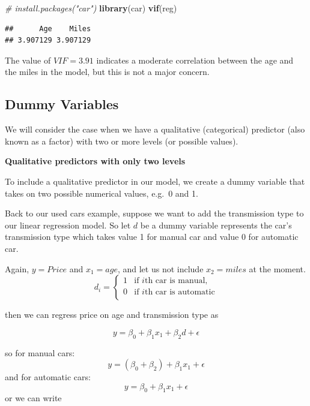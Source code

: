 \documentclass[
]{article}
\newenvironment{Shaded}{\begin{snugshade}}{\end{snugshade}}
\newcommand{\CommentTok}[1]{\textcolor[rgb]{0.56,0.35,0.01}{\textit{#1}}}
\newcommand{\FunctionTok}[1]{\textcolor[rgb]{0.13,0.29,0.53}{\textbf{#1}}}
\newcommand{\NormalTok}[1]{#1}
\begin{document}

\begin{Shaded}
\begin{Highlighting}[]
\CommentTok{\# install.packages("car")}
\FunctionTok{library}\NormalTok{(car)}
\FunctionTok{vif}\NormalTok{(reg)}
\end{Highlighting}
\end{Shaded}

\begin{verbatim}
##      Age    Miles 
## 3.907129 3.907129
\end{verbatim}

The value of \(VIF=3.91\) indicates a moderate correlation between the
age and the miles in the model, but this is not a major concern.

\hypertarget{dummy-variables}{%
\subsection{Dummy Variables}\label{dummy-variables}}

We will consider the case when we have a qualitative (categorical)
predictor (also known as a factor) with two or more levels (or possible
values).

\textbf{Qualitative predictors with only two levels}

To include a qualitative predictor in our model, we create a dummy
variable that takes on two possible numerical values, e.g.~0 and 1.

Back to our used cars example, suppose we want to add the transmission
type to our linear regression model. So let \(d\) be a dummy variable
represents the car's transmission type which takes value 1 for manual
car and value 0 for automatic car.

Again, \(y=Price\) and \(x_1=age\), and let us not include \(x_2=miles\)
at the moment. \[d_i=\left\{\begin{array}{ll}
1& \text{if $i$th car is manual,}\\
0& \text{if $i$th car is automatic}\\
\end{array}\right.\]

then we can regress price on age and transmission type as

\[y=\beta_0+\beta_1 x_1+\beta_2 d+\epsilon\]

so for manual cars: \[y=(\beta_0+\beta_2)+\beta_1 x_1+\epsilon\] and for
automatic cars: \[y=\beta_0+\beta_1 x_1+\epsilon\] or we can write
\end{document}
